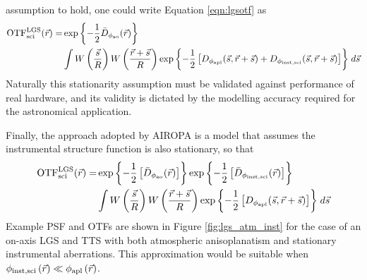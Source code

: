 assumption to hold, one could write Equation \ref{eqn:lgsotf} as
\begin{equation}\label{eqn:lgsotfb}
\begin{aligned}
{\rm OTF}^{\rm LGS}_{\rm sci}(\vec{r}) = 
& \exp{
\left\{ -\frac{1}{2} \bar{D}_{\rm \phi_{\rm ao}}(\vec{r}) \right\}}  \\
& \int 
W \left( \frac{\vec{s}}{R} \right)
W \left( \frac{\vec{r} + \vec{s}}{R} \right)
\exp{ \left\{ -\frac{1}{2} \left[
D_{\rm \phi_{apl}}(\vec{s}, \vec{r} + \vec{s}) +
D_{\rm \phi_{inst,sci}}(\vec{s}, \vec{r} + \vec{s})
\right] \right\} }
\; d\vec{s} 
\end{aligned}
\end{equation}
Naturally this stationarity assumption must be validated against
performance of real hardware, and its validity is dictated by the
modelling accuracy required for the astronomical application.  

Finally, the approach adopted by AIROPA is a model that assumes the instrumental
structure function is also stationary, so that
\begin{equation}\label{eqn:lgsotfc}
\begin{aligned}
{\rm OTF}^{\rm LGS}_{\rm sci}(\vec{r}) = 
& \exp{ \left\{ -\frac{1}{2}
\left[ \bar{D}_{\rm \phi_{\rm ao}}(\vec{r}) \right] \right\} } 
\exp{ \left\{ -\frac{1}{2}
\left[ \bar{D}_{\rm \phi_{\rm inst,sci}}(\vec{r}) \right] \right\} }  \\
& \int 
W \left( \frac{\vec{s}}{R} \right)
W \left( \frac{\vec{r} + \vec{s}}{R} \right)
\exp{ \left\{ -\frac{1}{2} \left[
D_{\rm \phi_{apl}}(\vec{s},\vec{r} + \vec{s})
\right] \right\} }
\; d\vec{s} 
\end{aligned}
\end{equation}
Example PSF and OTFs are shown in Figure \ref{fig:lgs_atm_inst} for
the case of an on-axis LGS and TTS with both atmospheric
anisoplanatism and stationary instrumental 
aberrations. This approximation would be suitable when 
$\phi_{\rm inst,sci} \left( \vec{r} \right) \ll 
\phi_{\rm apl} \left( \vec{r} \right)$. 

